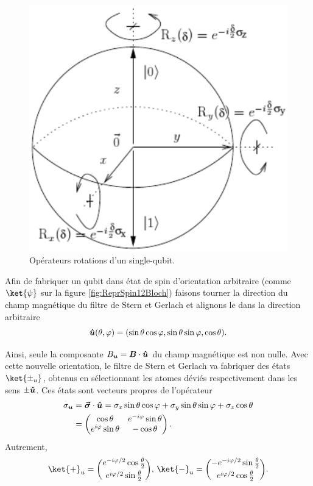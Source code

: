 \begin{figure}[ptbh]
\begin{minipage}[c]{.48\linewidth}
  \includegraphics[scale=.7]{graphics/SphereBloch2.pdf}
\fi
\caption{Opérateurs rotations d'un single-qubit.}%
\label{fig:SphereBloch2}%
\end{minipage}

\end{figure}

Afin de fabriquer un qubit dans état de spin d'orientation arbitraire (comme
$\ket{\psi}$ sur la figure \ref{fig:ReprSpin12Bloch}) faisons tourner la
direction du champ magnétique du filtre de Stern et Gerlach et alignons le dans
la direction arbitraire
\begin{equation}
\boldsymbol{\hat{u}}(\theta,\varphi)=(\sin\theta\cos\varphi,\sin\theta\sin\varphi, 
\cos\theta).
\end{equation}

Ainsi, seule la composante $B_{\boldsymbol{u}}=\boldsymbol{B}\cdot\boldsymbol{\hat{u}}$ du champ
magnétique est non nulle. Avec cette nouvelle orientation, le filtre de Stern et
Gerlach va fabriquer des états $\ket{\pm_{u}}$, obtenus en sélectionnant les
atomes déviés respectivement dans les sens $\pm \boldsymbol{\hat{u}}$. Ces états sont
vecteurs propres de l'opérateur%
\begin{equation}
\begin{split}
\sigma_{\boldsymbol{u}} & =\boldsymbol{\vec{\sigma}}\cdot\boldsymbol{\hat{u}}
=\sigma_{x}\sin\theta\cos\varphi+\sigma_{y}\sin\theta\sin\varphi+\sigma_z
\cos\theta\\
& =\begin{pmatrix}
\cos\theta & e^{-i\varphi}\sin\theta\\
e^{i\varphi}\sin\theta & -\cos\theta
\end{pmatrix}.
\end{split}
\end{equation}
Autrement,
\begin{equation}
\ket{+}_{u}=\binom{e^{-i\varphi/2}\cos\frac{\theta}{2}}{e^{i\varphi/2}\sin\frac{
\theta}{2}},\,\ket{-}_{u}=\binom{-e^{-i\varphi/2}\sin\frac{\theta}{2}}{e^{
i\varphi/2}\cos\frac{\theta}{2}}.
\end{equation}

